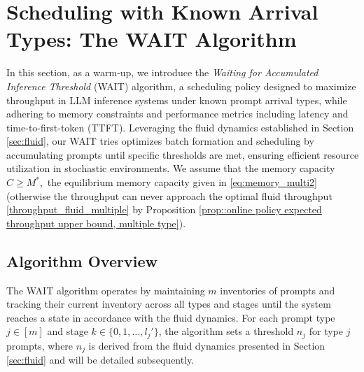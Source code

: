 \section{Scheduling with Known Arrival Types: The WAIT Algorithm}
\label{sec:wait}

In this section, as a warm-up, we introduce the \textit{Waiting for Accumulated Inference Threshold} (WAIT) algorithm, a scheduling policy designed to maximize throughput in LLM inference systems under known prompt arrival types, while adhering to memory constraints and performance metrics including latency and time-to-first-token (TTFT). Leveraging the fluid dynamics established in Section \ref{sec:fluid}, our WAIT tries optimizes batch formation and scheduling by accumulating prompts until specific thresholds are met, ensuring efficient resource utilization in stochastic environments. We assume that the memory capacity $C\ge M^*,$ the equilibrium memory capacity given in \eqref{eq:memory_multi2} (otherwise the throughput can never approach the optimal fluid throughput \eqref{throughput_fluid_multiple} by Proposition \ref{prop::online policy expected throughput upper bound, multiple type}).

\subsection{Algorithm Overview}
The WAIT algorithm operates by maintaining $m$ inventories of prompts and tracking their current inventory across all types and stages until the system reaches a state in accordance with the fluid dynamics. For each prompt type \( j \in [m] \) and stage \( k \in \{0, 1, \dots, l_j'\} \), the algorithm sets a threshold \( n_j \) for type \( j \) prompts, where \( n_j \) is derived from the fluid dynamics presented in Section \ref{sec:fluid} and will be detailed subsequently.


